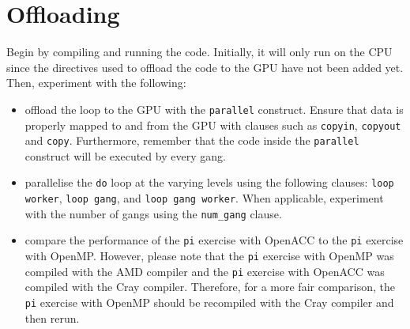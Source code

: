 \documentclass{article}
\begin{document}
\section{Offloading}

Begin by compiling and running the code. Initially, it will only run on the CPU since the directives used to offload the code to the GPU have not been added yet. \\

\noindent Then, experiment with the following:



\begin{itemize}
    \item offload the loop to the GPU with the \texttt{parallel} construct. Ensure that data is properly mapped to and from the GPU with clauses such as \texttt{copyin}, \texttt{copyout} and \texttt{copy}. Furthermore, remember that the code inside the \texttt{parallel} construct will be executed by every gang.
    \item parallelise the \texttt{do} loop at the varying levels using the following clauses: \texttt{loop worker}, \texttt{loop gang}, and \texttt{loop gang worker}. When applicable, experiment with the number of gangs using the \texttt{num\_gang} clause.
    \item compare the performance of the \texttt{pi} exercise with OpenACC to the \texttt{pi} exercise with OpenMP. However, please note that the \texttt{pi} exercise with OpenMP was compiled with the AMD compiler and the \texttt{pi} exercise with OpenACC was compiled with the Cray compiler. Therefore, for a more fair comparison, the \texttt{pi} exercise with OpenMP should be recompiled with the Cray compiler and then rerun. 
\end{itemize}
\end{document}
